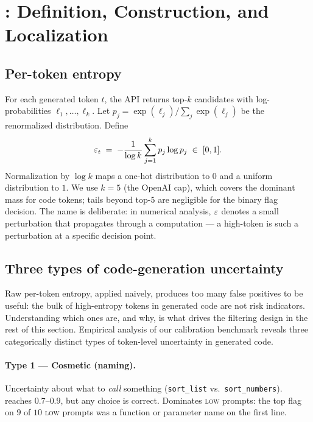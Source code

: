 \section{\eps: Definition, Construction, and Localization}
\label{sec:epsilon}

\subsection{Per-token entropy}
\label{subsec:per-token}

For each generated token $t$, the API returns top-$k$ candidates with
log-probabilities $\ell_1, \dots, \ell_k$. Let
$p_j = \exp(\ell_j) / \sum_j \exp(\ell_j)$ be the renormalized
distribution. Define
\begin{equation}
    \varepsilon_t \;=\; -\frac{1}{\log k} \sum_{j=1}^{k} p_j \log p_j
    \;\in\; [0,1].
    \label{eq:eps}
\end{equation}
Normalization by $\log k$ maps a one-hot distribution to $0$ and a
uniform distribution to $1$. We use $k=5$ (the OpenAI cap), which
covers the dominant mass for code tokens; tails beyond top-$5$ are
negligible for the binary flag decision. The name is deliberate: in
numerical analysis, $\varepsilon$ denotes a small perturbation that
propagates through a computation --- a high-\eps token is such a
perturbation at a specific decision point.

\subsection{Three types of code-generation uncertainty}
\label{subsec:types}

Raw per-token entropy, applied naively, produces too many false
positives to be useful: the bulk of high-entropy tokens in generated
code are not risk indicators. Understanding which ones are, and why,
is what drives the filtering design in the rest of this section.
Empirical analysis of our calibration benchmark reveals three
categorically distinct types of token-level uncertainty in generated
code.

\paragraph{Type 1 --- Cosmetic (naming).} Uncertainty about what to
\emph{call} something (\texttt{sort\_list} vs.\ \texttt{sort\_numbers}).
\eps reaches $0.7$--$0.9$, but any choice is correct. Dominates
\textsc{low} prompts: the top flag on $9$ of $10$ \textsc{low} prompts
was a function or parameter name on the first line.

